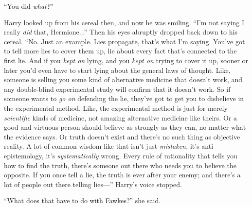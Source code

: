 “You did \emph{what?}”

Harry looked up from his cereal then, and now he was smiling. “I’m not saying I really \emph{did} that, Hermione...” Then his eyes abruptly dropped back down to his cereal. “No. Just an example. Lies propagate, that’s what I’m saying. You’ve got to tell more lies to cover them up, lie about every fact that’s connected to the first lie. And if you \emph{kept on} lying, and you \emph{kept on} trying to cover it up, sooner or later you’d even have to start lying about the general laws of thought. Like, someone is selling you some kind of alternative medicine that doesn’t work, and any double-blind experimental study will confirm that it doesn’t work. So if someone wants to \emph{go on} defending the lie, they’ve got to get you to disbelieve in the experimental method. Like, the experimental method is just for merely \emph{scientific} kinds of medicine, not amazing alternative medicine like theirs. Or a good and virtuous person should believe as strongly as they can, no matter what the evidence says. Or truth doesn’t exist and there’s no such thing as objective reality. A lot of common wisdom like that isn’t just \emph{mistaken,} it’s anti-epistemology, it’s \emph{systematically} wrong. Every rule of rationality that tells you how to find the truth, there’s someone out there who needs you to believe the opposite. If you once tell a lie, the truth is ever after your enemy; and there’s a lot of people out there telling lies—” Harry’s voice stopped.

“What does that have to do with Fawkes?” she said.

